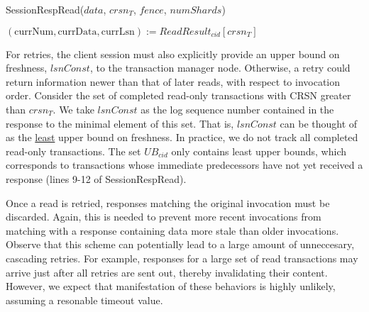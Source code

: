 \documentclass{article}
\begin{document}
\begin{procedure}[H]
  \caption{SessionRespRead($data$, $crsn_T$, $fence$, $numShards$)}
  $(\text{currNum}, \text{currData}, \text{currLsn}) := ReadResult_{cid}[crsn_T]$ \\
\end{procedure}
\par For retries, the client session must also explicitly provide an upper bound on freshness, $lsnConst$, to the transaction manager node. Otherwise, a retry could return information newer than that of later reads, with respect to invocation order. Consider the set of completed read-only transactions with CRSN greater than $crsn_T$. We take $lsnConst$ as the log sequence number contained in the response to the minimal element of this set. That is, $lsnConst$ can be thought of as the \underline{least} upper bound on freshness. In practice, we do not track all completed read-only transactions. The set $UB_{cid}$ only contains least upper bounds, which corresponds to transactions whose immediate predecessors have not yet received a response (lines 9-12 of SessionRespRead). 
\par Once a read is retried, responses matching the original invocation must be discarded. Again, this is needed to prevent more recent invocations from matching with a response containing data more stale than older invocations. Observe that this scheme can potentially lead to a large amount of unneccesary, cascading retries. For example, responses for a large set of read transactions may arrive just after all retries are sent out, thereby invalidating their content. However, we expect that manifestation of these behaviors is highly unlikely, assuming a resonable timeout value. 
\end{document}

